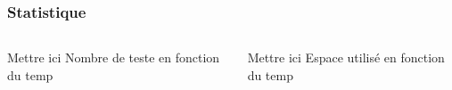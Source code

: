 

\begin{frame}
  \frametitle{Statistique}
  \begin{columns}
    \begin{column}{5cm}
      Mettre ici Nombre de teste en fonction du temp
      \tempTaille[0.6]
    \end{column}
    \begin{column}{5cm}
      Mettre ici Espace utilisé en fonction du temp
    \end{column}
  \end{columns}
\end{frame}
